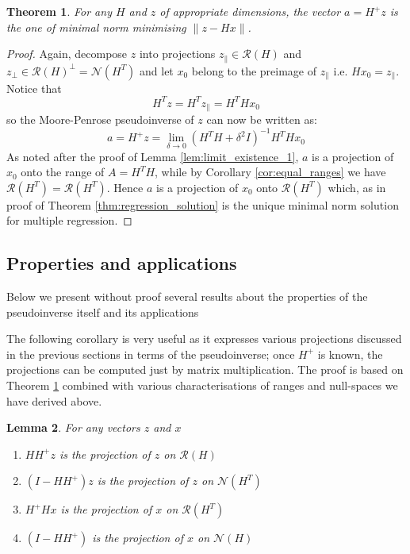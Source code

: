 \documentclass[a4paper]{article}
\theoremstyle{break}
\newtheorem{theorem}{Theorem}[section]
\newtheorem{lemma}[theorem]{Lemma}
\newcommand{\Nu}{\mathcal{N}}
\newcommand{\Ra}{\mathcal{R}}
\newcommand{\pll}{\parallel}
\begin{document}
\begin{theorem}\label{thm:mp_solves_regression}
    For any $H$ and $z$ of appropriate dimensions, the vector $a = H^+ z$ is the one of minimal norm minimising $ \| z - H x \| $.
\end{theorem}

\begin{proof}
    Again, decompose $z$ into projections $z_\pll \in \Ra(H)$ and $z_\perp \in \Ra(H)^\perp = \Nu(H^T)$ and let $x_0$ belong to the preimage of $z_\pll$ i.e. $H x_0 = z_\pll$. Notice that
        $$ H^T z = H^T z_\pll = H^T H x_0$$
    so the Moore-Penrose pseudoinverse of $z$ can now be written as:
        $$ a = H^+ z
         = \lim_{\delta \to 0} (H^T H + \delta^2 I)^{-1} H^T H x_0
        $$
    As noted after the proof of Lemma \ref{lem:limit_existence_1}, $a$ is a projection of $x_0$ onto the range of $ A = H^T H $, while by Corollary \ref{cor:equal_ranges} we have $\Ra(H^T) = \Ra(H^T)$.
    Hence $a$ is a projection of $x_0$ onto $\Ra(H^T)$ which, as in proof of Theorem \ref{thm:regression_solution} is the unique minimal norm solution for multiple regression.
\end{proof}

\subsection{Properties and applications}

Below we present without proof several results about the properties of the pseudoinverse itself and its applications

The following corollary is very useful as it expresses various projections discussed in the previous sections in terms of the pseudoinverse; once $ H^+ $ is known, the projections can be computed just by matrix multiplication. The proof is based on Theorem \ref{thm:mp_solves_regression} combined with various characterisations of ranges and null-spaces we have derived above.

\begin{lemma}
    For any vectors $z$ and $x$
    \begin{enumerate}
        \item $ H H^+ z $ is the projection of $z$ on $\Ra(H)$
        \item $ (I - H H^+) z $ is the projection of $z$ on $\Nu(H^T)$
        \item $ H^+ H x$ is the projection of $x$ on $ \Ra(H^T)$
        \item $ (I - H H^+) $ is the projection of $x$ on $ \Nu(H)$
    \end{enumerate}
\end{lemma}
\end{document}
